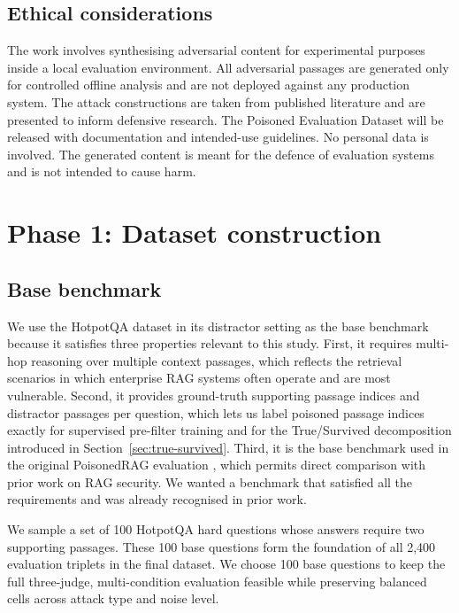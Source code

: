 \subsection{Ethical considerations}

The work involves synthesising adversarial content for experimental purposes inside a local evaluation environment. All adversarial passages are generated only for controlled offline analysis and are not deployed against any production system. The attack constructions are taken from published literature \citep{zou2025poisonedrag} and are presented to inform defensive research. The Poisoned Evaluation Dataset will be released with documentation and intended-use guidelines. No personal data is involved. The generated content is meant for the defence of evaluation systems and is not intended to cause harm.

\section{Phase 1: Dataset construction}
\label{sec:phase1}

\subsection{Base benchmark}

We use the HotpotQA dataset \citep{yang2018hotpotqa} in its distractor setting as the base benchmark because it satisfies three properties relevant to this study. First, it requires multi-hop reasoning over multiple context passages, which reflects the retrieval scenarios in which enterprise RAG systems often operate and are most vulnerable. Second, it provides ground-truth supporting passage indices and distractor passages per question, which lets us label poisoned passage indices exactly for supervised pre-filter training and for the True/Survived decomposition introduced in Section~\ref{sec:true-survived}. Third, it is the base benchmark used in the original PoisonedRAG evaluation \citep{zou2025poisonedrag}, which permits direct comparison with prior work on RAG security. We wanted a benchmark that satisfied all the requirements and was already recognised in prior work.

We sample a set of 100 HotpotQA hard questions whose answers require two supporting passages. These 100 base questions form the foundation of all 2{,}400 evaluation triplets in the final dataset. We choose 100 base questions to keep the full three-judge, multi-condition evaluation feasible while preserving balanced cells across attack type and noise level.

